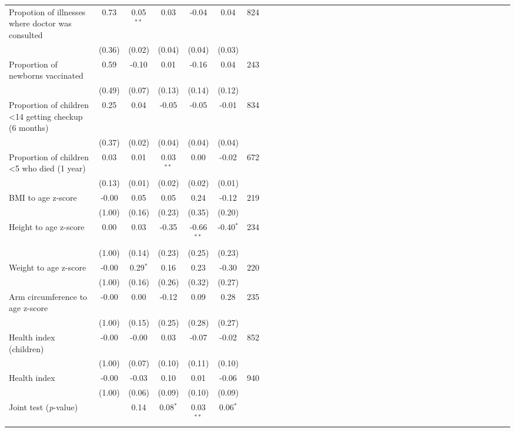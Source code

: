 {\begin{tabular}{l*{6}{SSSSSc}}
Propotion of illnesses where doctor was consulted&     0.73&0.05$^{**}$&     0.03&    -0.04&     0.04&      824\\
          &   (0.36)&   (0.02)&   (0.04)&   (0.04)&   (0.03)&         \\
Proportion of newborns vaccinated&     0.59&    -0.10&     0.01&    -0.16&     0.04&      243\\
          &   (0.49)&   (0.07)&   (0.13)&   (0.14)&   (0.12)&         \\
Proportion of children <14 getting checkup (6 months)&     0.25&     0.04&    -0.05&    -0.05&    -0.01&      834\\
          &   (0.37)&   (0.02)&   (0.04)&   (0.04)&   (0.04)&         \\
Proportion of children <5 who died (1 year)&     0.03&     0.01&0.03$^{**}$&     0.00&    -0.02&      672\\
          &   (0.13)&   (0.01)&   (0.02)&   (0.02)&   (0.01)&         \\
BMI to age z-score&    -0.00&     0.05&     0.05&     0.24&    -0.12&      219\\
          &   (1.00)&   (0.16)&   (0.23)&   (0.35)&   (0.20)&         \\
Height to age z-score&     0.00&     0.03&    -0.35&-0.66$^{**}$&-0.40$^{*}$&      234\\
          &   (1.00)&   (0.14)&   (0.23)&   (0.25)&   (0.23)&         \\
Weight to age z-score&    -0.00&0.29$^{*}$&     0.16&     0.23&    -0.30&      220\\
          &   (1.00)&   (0.16)&   (0.26)&   (0.32)&   (0.27)&         \\
Arm circumference to age z-score&    -0.00&     0.00&    -0.12&     0.09&     0.28&      235\\
          &   (1.00)&   (0.15)&   (0.25)&   (0.28)&   (0.27)&         \\
Health index (children)&    -0.00&    -0.00&     0.03&    -0.07&    -0.02&      852\\
          &   (1.00)&   (0.07)&   (0.10)&   (0.11)&   (0.10)&         \\
Health index&    -0.00&    -0.03&     0.10&     0.01&    -0.06&      940\\
          &   (1.00)&   (0.06)&   (0.09)&   (0.10)&   (0.09)&         \\
\midrule Joint test (\emph{p}-value)&         &     0.14&0.08$^{*}$&0.03$^{**}$&0.06$^{*}$&         \\
\bottomrule
\end{tabular}
}
